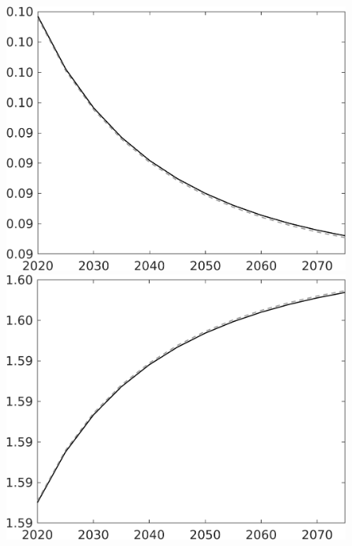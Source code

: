 \documentclass[12pt]{article}
\begin{document}
\begin{figure}[h!!]
\begin{minipage}[]{0.32\textwidth}
	\end{minipage}	
	\begin{minipage}[]{0.32\textwidth}
		\includegraphics[width=1\textwidth]{../../codding_model/own_basedOnFried/optimalPol_010922_revision/figures/all_13Sept22/CompTaul_Equlab_LFBAU_Reg0_pee_spillover0_nsk0_xgr0_knspil0_sep1_countec0_GovRev0_etaa0.79_lgd0.png}
	\end{minipage}	
	\begin{minipage}[]{0.32\textwidth}
		\includegraphics[width=1\textwidth]{../../codding_model/own_basedOnFried/optimalPol_010922_revision/figures/all_13Sept22/CompTaul_Equlab_LFBAU_Reg0_pn_spillover0_nsk0_xgr0_knspil0_sep1_countec0_GovRev0_etaa0.79_lgd0.png}

\end{minipage}
\end{figure}
\end{document}

